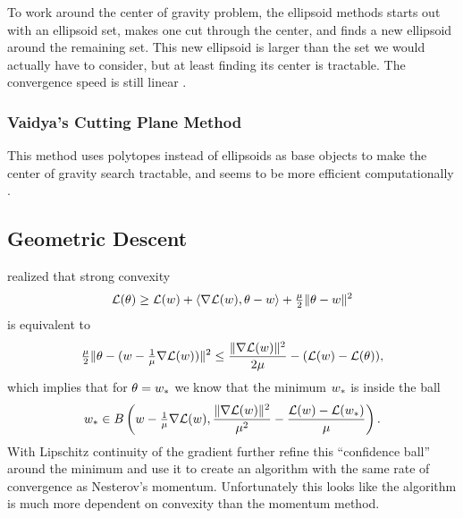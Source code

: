To work around the center of gravity problem, the ellipsoid methods starts out
with an ellipsoid set, makes one cut through the center, and finds a new
ellipsoid around the remaining set. This new ellipsoid is larger than the
set we would actually have to consider, but at least finding its center is
tractable. The convergence speed is still linear \parencite[e.g][Theorem
2.4]{bubeckConvexOptimizationAlgorithms2015}.


\subsubsection{Vaidya's Cutting Plane Method}

This method uses polytopes instead of ellipsoids as base objects to make the
center of gravity search tractable, and seems to be more efficient
computationally \parencite[e.g.][Section
2.3]{bubeckConvexOptimizationAlgorithms2015}.

\subsection{Geometric Descent}

\textcite{bubeckGeometricAlternativeNesterov2015} realized that strong convexity
\begin{align*}
	\mathcal{L}(\theta)
	\ge \mathcal{L}(w) + \langle \nabla\mathcal{L}(w), \theta-w\rangle
	+ \tfrac{\mu}{2}\|\theta-w\|^2
\end{align*}
is equivalent to
\begin{align*}
	\tfrac{\mu}{2}\|\theta - (w - \tfrac1{\mu} \nabla\mathcal{L}(w))\|^2
	\le \frac{\|\nabla\mathcal{L}(w)\|^2}{2\mu} - (\mathcal{L}(w)-\mathcal{L}(\theta)),
\end{align*}
which implies that for \(\theta=w_*\) we know that the minimum
\(w_*\) is inside the ball
\begin{align*}
	w_*\in B\left(w- \tfrac1{\mu}\nabla\mathcal{L}(w), 
		\frac{\|\nabla\mathcal{L}(w)\|^2}{\mu^2}
		- \frac{ \mathcal{L}(w)-\mathcal{L}(w_*) }{\mu}
	\right).
\end{align*}
With Lipschitz continuity of the gradient \textcite{bubeckGeometricAlternativeNesterov2015}
further refine this ``confidence ball'' around the minimum and use it to create
an algorithm with the same rate of convergence as Nesterov's momentum.
Unfortunately this looks like the algorithm is much more dependent on
convexity than the momentum method.


